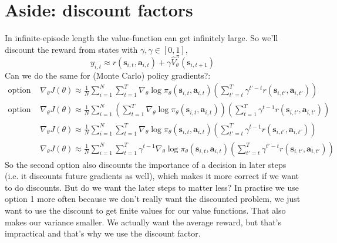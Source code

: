 \documentclass{report}
\begin{document}
\section{Aside: discount factors}
In infinite-episode length the value-function can get infinitely large.
So we'll discount the reward from states with $\gamma, \gamma \in [0,1]$,
\begin{equation}
		y_{i,t} \approx r(\bm{s}_{i,t}, \bm{a}_{i,t}) + \gamma \hat{V}^\pi_\theta(\bm{s}_{i, t+1})
\end{equation}
Can we do the same for (Monte Carlo) policy gradients?:
\begin{align}
\text{option 1: } & \nabla_\theta J(\theta) \approx \frac{1}{N} \sum_{i=1}^{N} \sum_{t=1}^{T} \nabla_{\theta} \log \pi_\theta(\bm{s}_{i,t}, \bm{a}_{i,t})
\left( \sum_{t'=t}^{T} \gamma^{t'-t} r(\bm{s}_{i,t'}, \bm{a}_{i,t'}) \right) \\ 
\text{option 2: } & \nabla_\theta J(\theta) \approx \frac{1}{N} \sum_{i=1}^{N}  \left( \sum_{t=1}^{T} \nabla_{\theta} \log \pi_\theta(\bm{s}_{i,t}, \bm{a}_{i,t}) \right)
\left( \sum_{t=1}^{T} \gamma^{t-1} r(\bm{s}_{i,t'}, \bm{a}_{i,t'}) \right) \\
				  &
\nabla_\theta J(\theta) \approx \frac{1}{N} \sum_{i=1}^{N}   \sum_{t=1}^{T} \nabla_{\theta} \log \pi_\theta(\bm{s}_{i,t}, \bm{a}_{i,t}) 
\left( \sum_{t'=t}^{T} \gamma^{t-1} r(\bm{s}_{i,t'}, \bm{a}_{i,t'}) \right)\\
				  &
				  \nabla_\theta J(\theta) \approx \frac{1}{N} \sum_{i=1}^{N}   \sum_{t=1}^{T} \gamma^{t-1} \nabla_{\theta} \log \pi_\theta(\bm{s}_{i,t}, \bm{a}_{i,t}) 
\left( \sum_{t'=t}^{T} \gamma^{t'-t} r(\bm{s}_{i,t'}, \bm{a}_{i,t'}) \right)
\end{align}
So the second option also discounts the importance of a decision in later steps (i.e. it discounts future gradients as well),
which makes it more correct if we want to do discounts.
But do we want the later steps to matter less?
In practise we use option 1 more often  because we don't really want the discounted problem,
we just want to use the discount to get finite values for our value functions.
That also makes our variance smaller.
We actually want the average reward, but that's impractical and that's why we use the discount factor.

\end{document}
